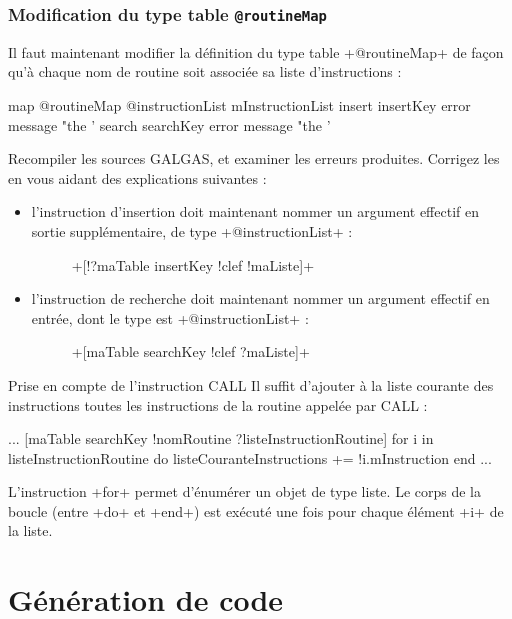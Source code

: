 \subsubsection{Modification du type table \texttt{@routineMap}}
Il faut maintenant modifier la définition du type table \ggs+@routineMap+ de façon qu'à chaque nom de routine soit associée sa liste d'instructions :

\begin{galgas}
map @routineMap {
  @instructionList mInstructionList
  insert insertKey  error message "the '%
  search searchKey error message "the '%
}
\end{galgas}

Recompiler les sources GALGAS, et examiner les erreurs produites. Corrigez les en vous aidant des explications suivantes :
\begin{itemize}
  \item l'instruction d'insertion doit maintenant nommer un argument effectif en sortie supplémentaire, de type \ggs+@instructionList+ :
  \begin{description}
    \item[ ] \ggs+[!?maTable insertKey !clef !maListe]+
  \end{description}
  \item l'instruction de recherche doit maintenant nommer un argument effectif en entrée, dont le type est \ggs+@instructionList+ :
  \begin{description}
    \item[ ] \ggs+[maTable searchKey !clef ?maListe]+
  \end{description}
\end{itemize}

Prise en compte de l'instruction CALL
Il suffit d'ajouter à la liste courante des instructions toutes les instructions de la routine appelée par CALL :
\begin{galgas}
...
[maTable searchKey !nomRoutine ?listeInstructionRoutine]
for i in listeInstructionRoutine do
  listeCouranteInstructions += !i.mInstruction
end
...
\end{galgas}

L'instruction \ggs+for+ permet d’énumérer un objet de type liste. Le corps de la boucle (entre \ggs+do+ et \ggs+end+) est exécuté une fois pour chaque élément \ggs+i+ de la liste.

\section{Génération de code}

